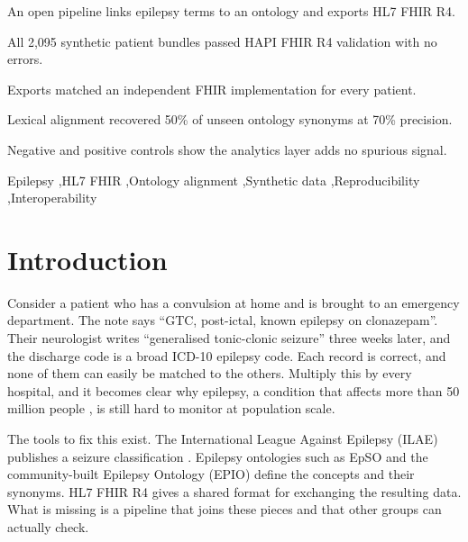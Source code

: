 \documentclass[preprint,12pt]{elsarticle}
\begin{document}
\begin{frontmatter}
\begin{abstract}
\noindent\textbf{Conclusions:} The interoperability layer is reliable. Ontology alignment by lexical means is useful but recovers only about half of unseen synonyms, and text-only mappings can be confidently wrong, so they need review before clinical use. All code, data-generation settings and results are released for reuse and for validation on real records.
\end{abstract}

\begin{highlights}
\item An open pipeline links epilepsy terms to an ontology and exports HL7 FHIR R4.
\item All 2,095 synthetic patient bundles passed HAPI FHIR R4 validation with no errors.
\item Exports matched an independent FHIR implementation for every patient.
\item Lexical alignment recovered 50\% of unseen ontology synonyms at 70\% precision.
\item Negative and positive controls show the analytics layer adds no spurious signal.
\end{highlights}

\begin{keyword}
Epilepsy \sep HL7 FHIR \sep Ontology alignment \sep Synthetic data \sep Reproducibility \sep Interoperability
\end{keyword}

\end{frontmatter}

\section{Introduction}
\label{sec:intro}

Consider a patient who has a convulsion at home and is brought to an emergency department. The note says ``GTC, post-ictal, known epilepsy on clonazepam''. Their neurologist writes ``generalised tonic-clonic seizure'' three weeks later, and the discharge code is a broad ICD-10 epilepsy code. Each record is correct, and none of them can easily be matched to the others. Multiply this by every hospital, and it becomes clear why epilepsy, a condition that affects more than 50 million people \cite{who2019}, is still hard to monitor at population scale.

The tools to fix this exist. The International League Against Epilepsy (ILAE) publishes a seizure classification \cite{fisher2017}. Epilepsy ontologies such as EpSO \cite{sahoo2014} and the community-built Epilepsy Ontology (EPIO) \cite{sargsyan2023} define the concepts and their synonyms. HL7 FHIR R4 \cite{fhir} gives a shared format for exchanging the resulting data. What is missing is a pipeline that joins these pieces and that other groups can actually check.
\end{document}
